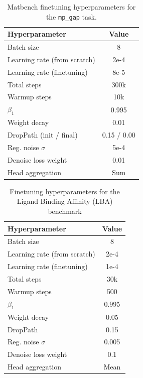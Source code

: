 \begin{table}[t]
\centering
\caption{Matbench finetuning hyperparameters for the \texttt{mp\_gap} task.}
\label{tab:matbench_mpgap_hparams}
\begin{tabular}{lc}
\toprule
\textbf{Hyperparameter} & \textbf{Value} \\
\midrule
Batch size                 & 8 \\
Learning rate (from scratch) & 2e{-4} \\
Learning rate (finetuning)   & 8e{-5} \\
Total steps                & 300k \\
Warmup steps               & 10k \\
$\beta_1$                  & 0.995 \\
Weight decay               & 0.01 \\
DropPath (init / final)    & 0.15 / 0.00 \\
Reg. noise $\sigma$        & 5e{-4} \\
Denoise loss weight        & 0.01 \\
Head aggregation           & Sum \\
\bottomrule
\end{tabular}
\end{table}


\begin{table}[t]
\centering
\caption{Finetuning hyperparameters for the Ligand Binding Affinity (LBA) benchmark}
\label{tab:lba_hparams}
\begin{tabular}{lc}
\toprule
\textbf{Hyperparameter} & \textbf{Value} \\
\midrule
Batch size                  & 8 \\
Learning rate (from scratch) & 2e{-4} \\
Learning rate (finetuning)   & 1e{-4} \\
Total steps                 & 30k \\
Warmup steps                & 500 \\
$\beta_1$                   & 0.995 \\
Weight decay                & 0.05 \\
DropPath                    & 0.15 \\
Reg. noise $\sigma$         & 0.005 \\
Denoise loss weight         & 0.1 \\
Head aggregation            & Mean \\
\bottomrule
\end{tabular}
\end{table}


